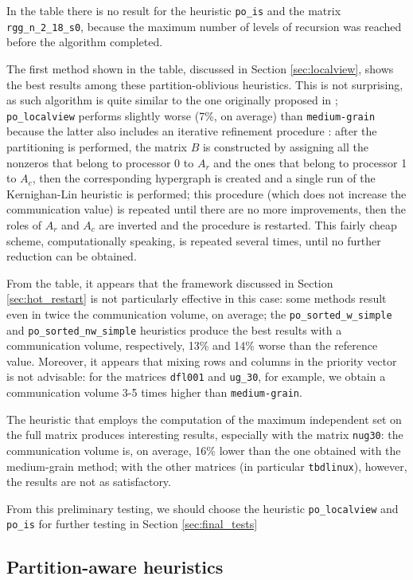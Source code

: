 In the table there is no result for the heuristic \verb|po_is| and the  matrix \verb|rgg_n_2_18_s0|, because the maximum number of levels of recursion was reached before the algorithm completed.


The first method shown in the table, discussed in Section \ref{sec:localview}, shows the best results among these partition-oblivious heuristics. This is not surprising, as such algorithm is quite similar to the one originally proposed in \cite{mediumgrain}; \verb|po_localview| performs slightly worse (7\%, on average) than \verb|medium-grain| because the latter also includes an iterative refinement procedure \cite[Section 3.3]{mediumgrain}: after the partitioning is performed, the matrix $B$ is constructed by assigning all the nonzeros that belong to processor 0 to $A_r$ and the ones that belong to processor 1 to $A_c$, then the corresponding hypergraph is created and a single run of the Kernighan-Lin heuristic is performed; this procedure (which does not increase the communication value) is repeated until there are no more improvements, then the roles of $A_r$ and $A_c$ are inverted and the procedure is restarted. This fairly cheap scheme, computationally speaking, is repeated several times, until no further reduction can be obtained. 

From the table, it appears that the framework discussed in Section \ref{sec:hot_restart} is not particularly effective in this case: some methods result even in twice the communication volume, on average; the \verb|po_sorted_w_simple| and \verb|po_sorted_nw_simple| heuristics produce the best results with a communication volume, respectively, 13\% and 14\% worse than the reference value. Moreover, it appears that mixing rows and columns in the priority vector is not advisable: for the matrices \verb|dfl001| and \verb|ug_30|, for example, we obtain a communication volume 3-5 times higher than \verb|medium-grain|. 

The heuristic that employs the computation of the maximum independent set on the full matrix produces interesting results, especially with the matrix \verb|nug30|: the communication volume is, on average, 16\% lower than the one obtained with the medium-grain method; with the other matrices (in particular \verb|tbdlinux|), however, the results are not as satisfactory.

From this preliminary testing, we should choose the heuristic \verb|po_localview| and \verb|po_is| for further testing in Section \ref{sec:final_tests}

\subsection{Partition-aware heuristics} \label{sec:preliminary_pa}

